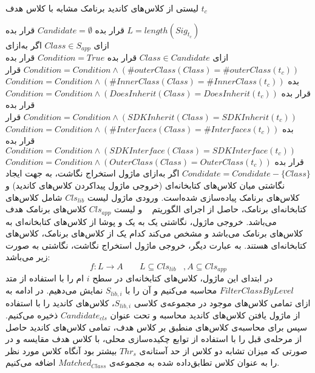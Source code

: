  لیستی از کلاس‌های کاندید برنامک مشابه با کلاس هدف $t_c$

 قرار بده $Candidate = \emptyset$ 
 قرار بده $L= length(Sig_{t_c})$  \\
‌ازای $Class \in S_{app}$ 
‌اگر
‌به‌ازای\\
‌ازای $Class \in Candidate$ 
 قرار بده $Condition = True$
 قرار بده $Condition= Condition \wedge (\#outerClass(Class) = \#outerClass(t_c))$
 قرار بده $Condition= Condition \wedge (\#InnerClass(Class) = \#InnerClass(t_c))$
 قرار بده $Condition= Condition \wedge (DoesInherit(Class) = DoesInherit(t_c))$
 قرار بده $Condition= Condition \wedge (SDKInherit(Class) = SDKInherit(t_c))$
 قرار بده $Condition= Condition \wedge (\#Interfaces(Class) = \#Interfaces(t_c))$
 قرار بده $Condition= Condition \wedge (SDKInterface(Class) = SDKInterface(t_c))$
 قرار بده $Condition= Condition \wedge (OuterClass(Class) = OuterClass(t_c))$
$Condidate=Condidate - \{Class\}$
‌اگر
‌به‌ازای
ماژول استخراج نگاشت، به جهت ایجاد نگاشتی میان کلاس‌های کتابخانه‌ای (خروجی ماژول پیداکردن کلاس‌های کاندید)‌ و کلاس‌های برنامک پیاده‌سازی شده‌است. ورودی ماژول لیست $Cls_{lib}$  شامل کلاس‌های کتابخانه‌ای برنامک، حاصل از اجرای الگوریتم ~ و لیست $Cls_{app}$ کلاس‌های برنامک هدف می‌باشد. خروجی ماژول، نگاشتی یک به یک و پوشا از کلاس‌های کتابخانه‌ای به کلاس‌های برنامک می‌باشد و مشخص می‌کند کدام یک از کلاس‌های برنامک، کلاس‌های کتابخانه‌ای هستند. به عبارت دیگر، خروجی ماژول استخراج نگاشت، نگاشتی به صورت زیر می‌باشد:
  \begin{equation}
  	f: L \rightarrow A  \;\;\;\;\;\;\; L\subseteq Cls_{lib}  \;\;\; , A \subseteq Cls_{app}
  \end{equation}
در ابتدای این ماژول، کلاس‌های کتابخانه‌ای در سطح $i$ ام را با استفاده از متد $FilterClassByLevel$ محاسبه می‌کنیم و آن‌ را با $S_{lib,i}$ نمایش می‌دهیم. در ادامه به ازای تمامی کلاس‌های موجود در مجموعه‌ی کلاسی $S_{lib,i}$، کلاس‌های کاندید را با استفاده از ماژول یافتن کلاس‌های کاندید محاسبه و تحت عنوان $Candidate_{cls}$ ذخیره می‌کنیم.  سپس برای محاسبه‌ی کلاس‌های منطبق بر کلاس هدف، تمامی کلاس‌های کاندید حاصل از مرحله‌ی قبل را با استفاده از توابع چکیده‌سازی محلی، با کلاس هدف مقایسه و در صورتی که میزان تشابه دو کلاس از حد آستانه‌ی $Thr_{s}$ بیشتر بود آنگاه کلاس مورد نظر را به عنوان کلاس تطابق‌داده شده به مجموعه‌ی $Matched_{Class}$ اضافه می‌کنیم.  


